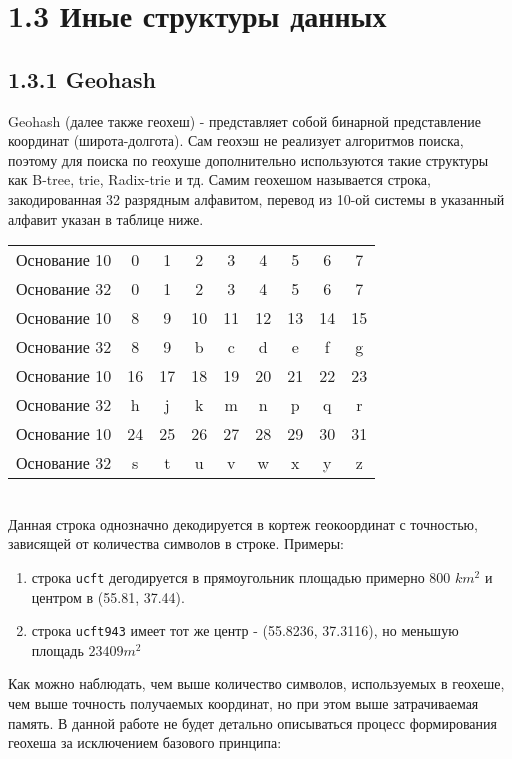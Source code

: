 \section{1.3 Иные структуры данных}

\subsection{1.3.1 Geohash}
Geohash (далее также геохеш) - представляет собой бинарной представление координат (широта-долгота). Сам геохэш не реализует алгоритмов поиска, поэтому для поиска по геохуше дополнительно используются такие структуры как B-tree, trie, Radix-trie и тд.
Самим геохешом называется строка, закодированная 32 разрядным алфавитом, перевод из 10-ой системы в указанный алфавит указан в таблице ниже.
  \\
\begin{center}
\begin{tabular}{ c|c c c c c c c c }
 Основание 10 & 0 & 1 & 2 & 3 & 4 & 5 & 6 & 7 \\
 Основание 32 & 0 & 1 & 2 & 3 & 4 & 5 & 6 & 7 \\
  \hline\hline
 Основание 10 & 8 & 9 & 10 & 11 & 12 & 13 & 14 & 15 \\
 Основание 32 & 8 & 9 & b & c & d & e & f & g \\
  \hline\hline
 Основание 10 & 16 & 17 & 18 & 19 & 20 & 21 & 22 & 23  \\
 Основание 32 & h & j & k & m & n & p & q & r \\
  \hline\hline
 Основание 10 & 24 & 25 & 26 & 27 & 28 & 29 & 30 & 31 \\
 Основание 32 & s & t & u & v & w & x & y & z \\
\end{tabular}
\end{center}
  \\
Данная строка однозначно декодируется в кортеж геокоординат с точностью, зависящей от количества символов в строке. Примеры:
\begin{enumerate}
    \item строка \texttt{ucft} дегодируется в прямоугольник площадью примерно 800 $ km^2 $ и центром в (55.81, 37.44).
    \item строка \texttt{ucft943} имеет тот же центр - (55.8236, 37.3116), но меньшую площадь $23409 m^2$
\end{enumerate}
Как можно наблюдать, чем выше количество символов, используемых в геохеше, чем выше точность получаемых координат, но при этом выше затрачиваемая память.
В данной работе не будет детально описываться процесс формирования геохеша за исключением базового принципа: 

